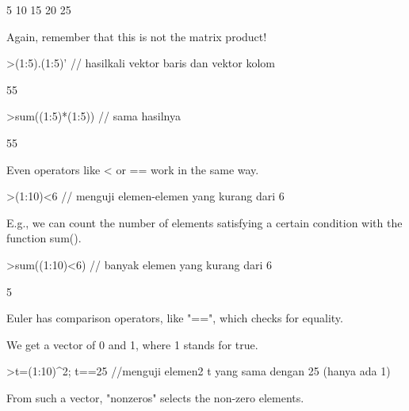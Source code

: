 \documentclass{article}
\begin{document}
\begin{eulernotebook}
\begin{eulercomment}
\begin{eulercomment}
\begin{eulercomment}
\begin{eulercomment}
\begin{euleroutput}
              5            10            15            20            25 
\end{euleroutput}
\begin{eulercomment}
Again, remember that this is not the matrix product!
\end{eulercomment}
\begin{eulerprompt}
>(1:5).(1:5)' // hasilkali vektor baris dan vektor kolom
\end{eulerprompt}
\begin{euleroutput}
  55
\end{euleroutput}
\begin{eulerprompt}
>sum((1:5)*(1:5)) // sama hasilnya
\end{eulerprompt}
\begin{euleroutput}
  55
\end{euleroutput}
\begin{eulercomment}
Even operators like \textless{} or == work in the same way.
\end{eulercomment}
\begin{eulerprompt}
>(1:10)<6 // menguji elemen-elemen yang kurang dari 6
\end{eulerprompt}
\begin{euleroutput}
  [1,  1,  1,  1,  1,  0,  0,  0,  0,  0]
\end{euleroutput}
\begin{eulercomment}
E.g., we can count the number of elements satisfying a certain
condition with the function sum().
\end{eulercomment}
\begin{eulerprompt}
>sum((1:10)<6) // banyak elemen yang kurang dari 6
\end{eulerprompt}
\begin{euleroutput}
  5
\end{euleroutput}
\begin{eulercomment}
Euler has comparison operators, like "==", which checks for equality.

We get a vector of 0 and 1, where 1 stands for true.
\end{eulercomment}
\begin{eulerprompt}
>t=(1:10)^2; t==25 //menguji elemen2 t yang sama dengan 25 (hanya ada 1)
\end{eulerprompt}
\begin{euleroutput}
  [0,  0,  0,  0,  1,  0,  0,  0,  0,  0]
\end{euleroutput}
\begin{eulercomment}
From such a vector, "nonzeros" selects the non-zero elements.


\end{eulercomment}
\end{eulercomment}
\end{eulercomment}
\end{eulercomment}
\end{eulercomment}
\end{eulernotebook}
\end{document}
